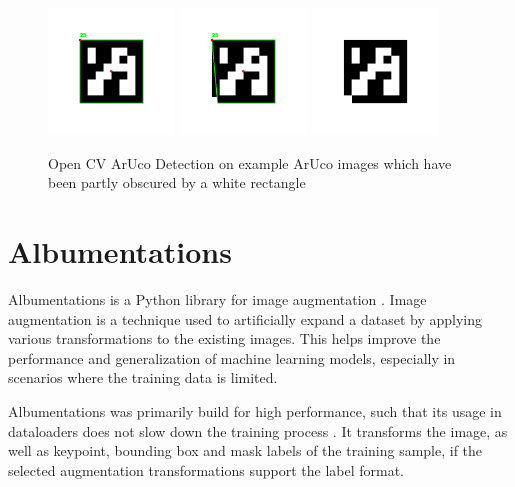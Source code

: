 \documentclass[10pt]{book}
\begin{document}
\begin{figure}
  \centering
     {\includegraphics[width=0.3\textwidth]{image/rec}}
     {\includegraphics[width=0.3\textwidth]{image/skewed-rec}}
     {\includegraphics[width=0.3\textwidth]{image/no-rec}}
  \caption{Open CV ArUco Detection on example \ac{ArUco} images which have been partly obscured by a white rectangle}
  \label{fig:aruco-det}
\end{figure}

\section{Albumentations}

Albumentations is a Python library for image augmentation \cite{info11020125}. Image augmentation is a technique used to artificially expand a dataset by applying various transformations to the existing images. This helps improve the performance and generalization of machine learning models, especially in scenarios where the training data is limited. 

Albumentations was primarily build for high performance, such that its usage in dataloaders does not slow down the training process \cite{info11020125}. It transforms the image, as well as keypoint, bounding box and mask labels of the training sample, if the selected augmentation transformations support the label format. 
\end{document}
